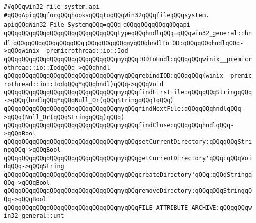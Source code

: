 \label{src/lib/std/src/win32/win32-file-system.api}
\verb|##qQQqwin32-file-system.api|\newline
\newline
\newline
\newline
\verb|#qQQqApiqQQqforqQQqhooksqQQqtoqQQqWin32qQQqfileqQQqsystem.|\newline
\newline
\newline
\newline
\verb|apiqQQqWin32_File_SystemqQQq=qQQq|\newline
\verb|qQQqqQQqqQQqqQQqapi|\newline
\verb|qQQqqQQqqQQqqQQqqQQqqQQqqQQqqQQqtypeqQQqhndlqQQq=qQQqwin32_general::hndl|\newline
\newline
\verb|qQQqqQQqqQQqqQQqqQQqqQQqqQQqqQQqmyqQQqhndlToIOD:qQQqqQQqhndlqQQq->qQQqwinix__premicrothread::io::Iod|\newline
\verb|qQQqqQQqqQQqqQQqqQQqqQQqqQQqqQQqmyqQQqIODToHndl:qQQqqQQqwinix__premicrothread::io::IodqQQq->qQQqhndl|\newline
\verb|qQQqqQQqqQQqqQQqqQQqqQQqqQQqqQQqmyqQQqrebindIOD:qQQqqQQq(winix__premicrothread::io::IodqQQq*qQQqhndl)qQQq->qQQqVoid|\newline
\newline
\verb|qQQqqQQqqQQqqQQqqQQqqQQqqQQqqQQqmyqQQqfindFirstFile:qQQqqQQqStringqQQq->qQQq(hndlqQQq*qQQqNull_Or(qQQqStringqQQq)qQQq)|\newline
\verb|qQQqqQQqqQQqqQQqqQQqqQQqqQQqqQQqmyqQQqfindNextFile:qQQqqQQqhndlqQQq->qQQq(Null_Or(qQQqStringqQQq)qQQq)|\newline
\verb|qQQqqQQqqQQqqQQqqQQqqQQqqQQqqQQqmyqQQqfindClose:qQQqqQQqhndlqQQq->qQQqBool|\newline
\newline
\verb|qQQqqQQqqQQqqQQqqQQqqQQqqQQqqQQqmyqQQqsetCurrentDirectory:qQQqqQQqStringqQQq->qQQqBool|\newline
\verb|qQQqqQQqqQQqqQQqqQQqqQQqqQQqqQQqmyqQQqgetCurrentDirectory'qQQq:qQQqVoidqQQq->qQQqString|\newline
\verb|qQQqqQQqqQQqqQQqqQQqqQQqqQQqqQQqmyqQQqcreateDirectory'qQQq:qQQqStringqQQq->qQQqBool|\newline
\verb|qQQqqQQqqQQqqQQqqQQqqQQqqQQqqQQqmyqQQqremoveDirectory:qQQqqQQqStringqQQq->qQQqBool|\newline
\newline
\verb|qQQqqQQqqQQqqQQqqQQqqQQqqQQqqQQqmyqQQqFILE_ATTRIBUTE_ARCHIVE:qQQqqQQqwin32_general::unt|\newline
